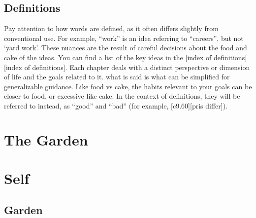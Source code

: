 \documentclass[
]{book}
\begin{document}
\hypertarget{definitions}{%
\section{Definitions}\label{definitions}}

Pay attention to how words are defined, as it often differs slightly from conventional use.
For example, ``work'' is an idea referring to ``careers'', but not `yard work'.
These nuances are the result of careful decisions about the food and cake of the ideas.
You can find a list of the key ideas in the {[}index of definitions{]}{[}index of definitions{]}.
Each chapter deals with a distinct perspective or dimension of life and the goals related to it. what is said is what can be simplified for generalizable guidance.
Like food vs cake, the habits relevant to your goals can be closer to food, or excessive like cake.
In the context of definitions, they will be referred to instead, as ``good'' and ``bad'' (for example, {[}c9.60{]}{[}pris differ{]}).

\hypertarget{the-garden}{%
\chapter*{The Garden}\label{the-garden}}

\hypertarget{self}{%
\chapter{Self}\label{self}}

\hypertarget{garden}{%
\section{Garden}\label{garden}}
\end{document}
